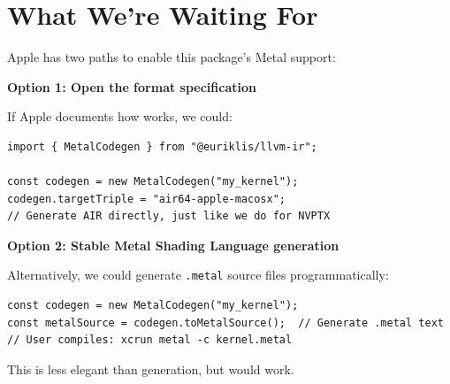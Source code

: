 \section{What We're Waiting For}

Apple has two paths to enable this package's Metal support:

\textbf{Option 1: Open the  format specification}

If Apple documents how  works\cite{airformat}, we could:
\begin{lstlisting}[style=ts]
import { MetalCodegen } from "@euriklis/llvm-ir";

const codegen = new MetalCodegen("my_kernel");
codegen.targetTriple = "air64-apple-macosx";
// Generate AIR directly, just like we do for NVPTX
\end{lstlisting}

\textbf{Option 2: Stable Metal Shading Language generation}

Alternatively, we could generate \texttt{.metal} source files programmatically\cite{metaltools}:
\begin{lstlisting}[style=ts]
const codegen = new MetalCodegen("my_kernel");
const metalSource = codegen.toMetalSource();  // Generate .metal text
// User compiles: xcrun metal -c kernel.metal
\end{lstlisting}

This is less elegant than   generation, but would work.


